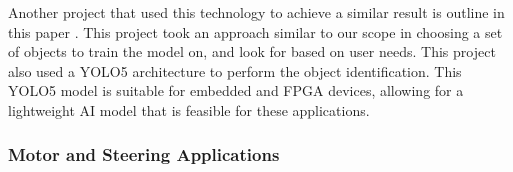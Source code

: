 \noindent Another project that used this technology to achieve a similar result is outline in this paper \cite{CVRef2}. This project took an approach similar to our scope in choosing a set of objects to train the model on, and look for based on user needs. This project also used a YOLO5 architecture to perform the object identification. This YOLO5 model is suitable for embedded and FPGA devices, allowing for a lightweight AI model that is feasible for these applications. \\



\subsubsection{Motor and Steering Applications} 


